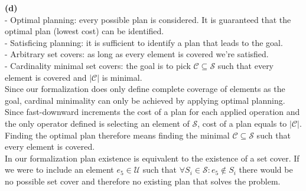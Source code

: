 \documentclass[11pt,a4paper]{article}
\begin{document}
\textbf{(d)}\\
- Optimal planning: every possible plan is considered. It is guaranteed that the optimal plan (lowest cost) can be identified.\\
- Satisficing planning: it is sufficient to identify a plan that leads to the goal.\\
- Arbitrary set covers: as long as every element is covered we're satisfied.\\
- Cardinality minimal set covers: the goal is to pick $\mathcal{C} \subseteq \mathcal{S}$ such that every element is covered and $|\mathcal{C}|$ is minimal.\\
Since our formalization does only define complete coverage of elements as the goal, cardinal minimality can only be achieved by applying optimal planning. Since fast-downward increments the cost of a plan for each applied operation and the only operator defined is selecting an element of $\mathcal{S}$, cost of a plan equals to $|\mathcal{C}|$. Finding the optimal plan therefore means finding the minimal $\mathcal{C} \subseteq \mathcal{S}$ such that every element is covered.\\
In our formalization plan existence is equivalent to the existence of a set cover. If we were to include an element $e_5 \in \mathcal{U}$ such that $\forall S_i \in \mathcal{S} : e_5 \notin S_i$ there would be no possible set cover and therefore no existing plan that solves the problem.
\end{document}
